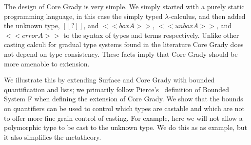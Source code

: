 The design of Core Grady is very simple.  We simply started with a
purely static programming language, in this case the simply typed
$\lambda$-calculus, and then added the unknown type, $[[?]]$, and
$<<box A>>$, $<<unbox A>>$, and $<<error A>>$ to the syntax of types
and terms respectively.  Unlike other casting calculi for gradual type
systems found in the literature \cite{Siek:2006,Siek:2015,Garcia:2016}
Core Grady does not depend on type consistency.  These facts imply
that Core Grady should be more amenable to extension.

We illustrate this by extending Surface and Core Grady with bounded
quantification and lists; we primarily follow
Pierce's~\cite{Pierce:2002:TPL:509043} definition of Bounded System F
when defining the extension of Core Grady.  We show that the bounds on
quantifiers can be used to control which types are castable and which
are not to offer more fine grain control of casting.  For example,
here we will not allow a polymorphic type to be cast to the unknown
type.  We do this as as example, but it also simplifies the
metatheory.

